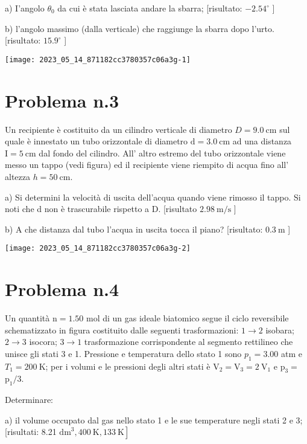 \documentclass[10pt]{article}
\begin{document}
a) I'angolo \(\theta_{0}\) da cui è stata lasciata andare la sbarra; [risultato: \(-2.54^{\circ}\) ]

b) l'angolo massimo (dalla verticale) che raggiunge la sbarra dopo l'urto. [risultato: \(15.9^{\circ}\) ]

\begin{center}
\texttt{[image: 2023\_05\_14\_871182cc3780357c06a3g-1]}
\end{center}

\section{Problema n.3}
Un recipiente è costituito da un cilindro verticale di diametro \(D=9.0 \mathrm{~cm}\) sul quale è innestato un tubo orizzontale di diametro \(\mathrm{d}=3.0 \mathrm{~cm}\) ad una distanza \(\mathrm{I}=5 \mathrm{~cm}\) dal fondo del cilindro. All' altro estremo del tubo orizzontale viene messo un tappo (vedi figura) ed il recipiente viene riempito di acqua fino all' altezza \(h=50 \mathrm{~cm}\).

a) Si determini la velocità di uscita dell'acqua quando viene rimosso il tappo. Si noti che d non è trascurabile rispetto a D. [risultato \(2.98 \mathrm{~m} / \mathrm{s}\) ]

b) A che distanza dal tubo l'acqua in uscita tocca il piano? [risultato: \(0.3 \mathrm{~m}\) ]

\begin{center}
\texttt{[image: 2023\_05\_14\_871182cc3780357c06a3g-2]}
\end{center}

\section{Problema n.4}
Un quantità \(\mathrm{n}=1.50\) mol di un gas ideale biatomico segue il ciclo reversibile schematizzato in figura costituito dalle seguenti trasformazioni: \(1 \rightarrow 2\) isobara; \(2 \rightarrow 3\) isocora; \(3 \rightarrow 1\) trasformazione corrispondente al segmento rettilineo che unisce gli stati 3 e 1. Pressione e temperatura dello stato 1 sono \(p_{1}=3.00\) atm e \(T_{1}=200 \mathrm{~K}\); per i volumi e le pressioni degli altri stati è \(\mathrm{V}_{2}=\mathrm{V}_{3}=2 \mathrm{~V}_{1}\) e \(\mathrm{p}_{3}=\) \(\mathrm{p}_{1} / 3\).

Determinare:

a) il volume occupato dal gas nello stato 1 e le sue temperature negli stati 2 e 3; [risultati: 8.21 \(\left.\mathrm{dm}^{3}, 400 \mathrm{~K}, 133 \mathrm{~K}\right]\)
\end{document}

